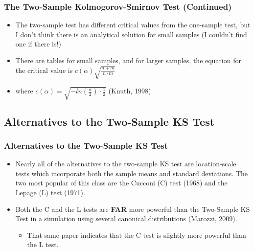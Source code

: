 
\begin{frame}
\frametitle{The Two-Sample Kolmogorov-Smirnov Test (Continued)}
\begin{itemize}
    \item The two-sample test has different critical values from the one-sample test, but I don't think there is an analytical solution for small samples (I couldn't find one if there is!)
    \item There are tables for small samples, and for larger samples, the equation for the critical value is $c(\alpha)\sqrt{\frac{n+m}{n \cdot m}}$
    \item where $c(\alpha) = \sqrt{-ln(\frac{\alpha}{2})\cdot \frac{1}{2}}$ (Knuth, 1998)
\end{itemize}
\end{frame}


\subsection{Alternatives to the Two-Sample KS Test}

\begin{frame}
\frametitle{Alternatives to the Two-Sample KS Test}
\begin{itemize}
    \item Nearly all of the alternatives to the two-sample KS test are location-scale tests which incorporate both the sample means and standard deviations. The two most popular of this class are the Cucconi (C) test (1968) and the Lepage (L) test (1971).
    \item Both the C and the L tests are \textbf{FAR} more powerful than the Two-Sample KS Test in a simulation using several canonical distributions (Marozzi, 2009).
    \begin{itemize}
        \item That same paper indicates that the C test is slightly more powerful than the L test.
    \end{itemize}
\end{itemize}
\end{frame}


